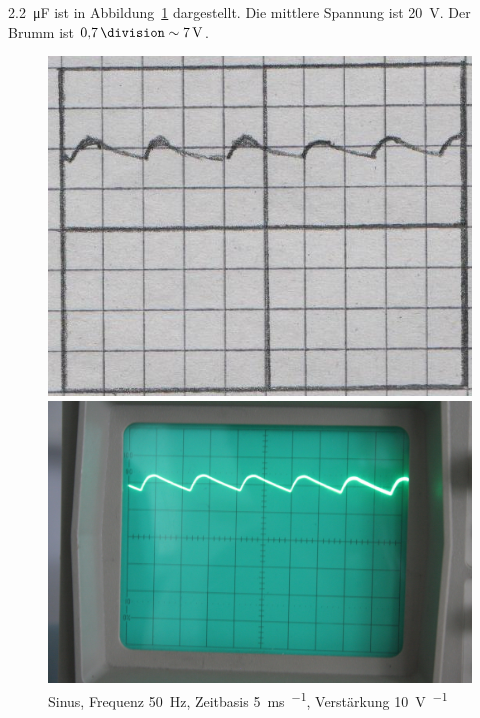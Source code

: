 \SI{2.2}{\micro\farad} ist in Abbildung~\ref{fig:797} dargestellt. Die
mittlere Spannung ist \SI{20}{\volt}. Der Brumm ist $\SI{.7}\division \sim \SI
7\volt$.

\begin{figure}[htbp]
	\centering
	\begin{minipage}{.45\linewidth}
	\includegraphics[width=\linewidth]{Oszi_Hand/797.jpg}
	\end{minipage}
	\hfill
	\begin{minipage}{.45\linewidth}
	\includegraphics[width=\linewidth]{Oszi_Foto/797.jpg}
	\end{minipage}
	\caption{%
		Sinus, Frequenz \SI{50}{\hertz},
		Zeitbasis \SI{5}{\milli\second\per\division},
		Verstärkung \SI{10}{\volt\per\division}
	}
	\label{fig:797}
\end{figure}

